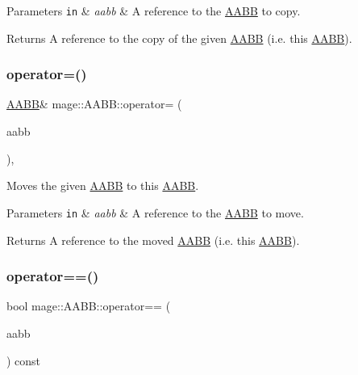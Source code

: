 \begin{DoxyParams}[1]{Parameters}
\mbox{\tt in}  & {\em aabb} & A reference to the \hyperlink{classmage_1_1_a_a_b_b}{A\+A\+BB} to copy. \\
\hline
\end{DoxyParams}
\begin{DoxyReturn}{Returns}
A reference to the copy of the given \hyperlink{classmage_1_1_a_a_b_b}{A\+A\+BB} (i.\+e. this \hyperlink{classmage_1_1_a_a_b_b}{A\+A\+BB}). 
\end{DoxyReturn}
\hypertarget{classmage_1_1_a_a_b_b_acc54304ce3bde3ea3aa2b487f2d975b7}{}\label{classmage_1_1_a_a_b_b_acc54304ce3bde3ea3aa2b487f2d975b7} 
\subsubsection{\texorpdfstring{operator=()}{operator=()}\hspace{0.1cm}{\footnotesize\ttfamily [2/2]}}
{\footnotesize\ttfamily \hyperlink{classmage_1_1_a_a_b_b}{A\+A\+BB}\& mage\+::\+A\+A\+B\+B\+::operator= (\begin{DoxyParamCaption}\item[{\hyperlink{classmage_1_1_a_a_b_b}{A\+A\+BB} \&\&}]{aabb }\end{DoxyParamCaption})\hspace{0.3cm}{\ttfamily [default]}, {\ttfamily [noexcept]}}

Moves the given \hyperlink{classmage_1_1_a_a_b_b}{A\+A\+BB} to this \hyperlink{classmage_1_1_a_a_b_b}{A\+A\+BB}.


\begin{DoxyParams}[1]{Parameters}
\mbox{\tt in}  & {\em aabb} & A reference to the \hyperlink{classmage_1_1_a_a_b_b}{A\+A\+BB} to move. \\
\hline
\end{DoxyParams}
\begin{DoxyReturn}{Returns}
A reference to the moved \hyperlink{classmage_1_1_a_a_b_b}{A\+A\+BB} (i.\+e. this \hyperlink{classmage_1_1_a_a_b_b}{A\+A\+BB}). 
\end{DoxyReturn}
\hypertarget{classmage_1_1_a_a_b_b_a9297ff005f7bdcd934d744a6fb7ab5c9}{}\label{classmage_1_1_a_a_b_b_a9297ff005f7bdcd934d744a6fb7ab5c9} 
\subsubsection{\texorpdfstring{operator==()}{operator==()}}
{\footnotesize\ttfamily bool mage\+::\+A\+A\+B\+B\+::operator== (\begin{DoxyParamCaption}\item[{const \hyperlink{classmage_1_1_a_a_b_b}{A\+A\+BB} \&}]{aabb }\end{DoxyParamCaption}) const\hspace{0.3cm}{\ttfamily [noexcept]}}

